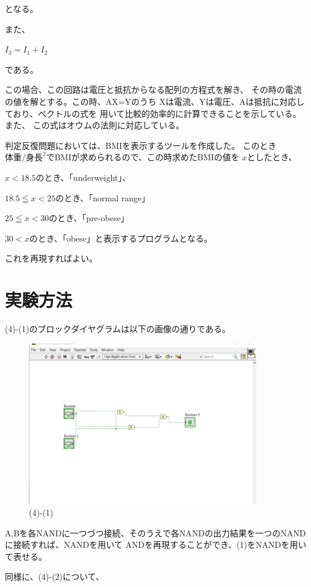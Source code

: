 \documentclass[a4paper,titlepage,11pt]{ltjsarticle}
\begin{document}
となる。

また、

$I_{3}=I_{1}+I_{2}$

である。

この場合、この回路は電圧と抵抗からなる配列の方程式を解き、
その時の電流の値を解とする。この時、AX=Yのうち
Xは電流、Yは電圧、Aは抵抗に対応しており、ベクトルの式を
用いて比較的効率的に計算できることを示している。また、
この式はオウムの法則に対応している。

判定反復問題においては、BMIを表示するツールを作成した。
このとき$体重/身長^2$でBMIが求められるので、この時求めたBMIの値を
$x$としたとき、

$x<18.5$のとき、「underweight」、

$18.5 \leqq x<25$のとき、「normal range」

$25 \leqq x <30$のとき、「pre-obese」

$30<x$のとき、「obese」と表示するプログラムとなる。

これを再現すればよい。

\section{実験方法}
(4)-(1)のブロックダイヤグラムは以下の画像の通りである。
\begin{figure}[H]
  \begin{center}
    \includegraphics[width=100mm]{4-2b.pdf}
    \caption{(4)-(1)}
  \end{center}
\end{figure}

A,Bを各NANDに一つづつ接続、そのうえで各NANDの出力結果を一つのNANDに接続すれば、NANDを用いて
ANDを再現することができ、(1)をNANDを用いて表せる。

同様に、(4)-(2)について、
\end{document}

